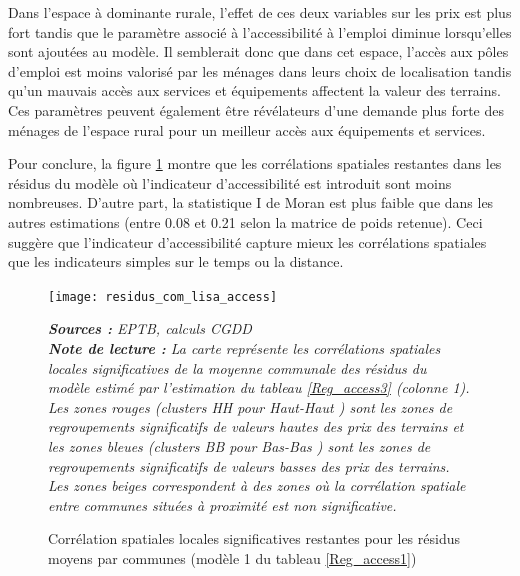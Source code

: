 \documentclass[10.5pt,a4paper]{article}
\begin{document}
{Dans l'espace à dominante rurale, l'effet de ces deux variables sur les prix est plus fort tandis que le paramètre associé à l'accessibilité à l'emploi diminue lorsqu'elles sont ajoutées au modèle. Il semblerait donc que dans cet espace, l'accès aux pôles d'emploi est moins valorisé par les ménages dans leurs choix de localisation tandis qu'un mauvais accès aux services et équipements affectent la valeur des terrains. Ces paramètres peuvent également être révélateurs d'une demande plus forte des ménages de l'espace rural pour un meilleur accès aux équipements et services. \par


 

Pour conclure, la figure \ref{residus_com_lisa_access} montre que les corrélations spatiales restantes dans les résidus du modèle où l'indicateur d'accessibilité est introduit sont moins nombreuses. D'autre part, la statistique I de Moran est plus faible que dans les autres estimations (entre 0.08 et 0.21 selon la matrice de poids retenue). Ceci suggère que l'indicateur d'accessibilité capture mieux les corrélations spatiales que les indicateurs simples sur le temps ou la distance. \par

\begin{figure}[!h]%
\caption{Corrélation spatiales locales significatives restantes pour les résidus moyens par communes (modèle 1 du tableau  \ref{Reg_access1})}%
\label{residus_com_lisa_access}%
\texttt{[image: residus\_com\_lisa\_access]}%

\scriptsize\textit{\textbf{Sources :} EPTB, calculs CGDD \\
\textbf{Note de lecture :} La carte représente les corrélations spatiales locales significatives de la moyenne communale des résidus du modèle estimé par l'estimation du tableau \ref{Reg_access3} (colonne 1).  Les zones rouges (clusters HH pour \og Haut-Haut \fg) sont les zones de regroupements significatifs de valeurs hautes des prix des terrains et les zones bleues (clusters BB pour \fg Bas-Bas \fg) sont les zones de regroupements significatifs de valeurs basses des prix des terrains. Les zones beiges correspondent à des zones où la corrélation spatiale entre communes situées à proximité est non significative.}
\end{figure}

}
\end{document}
